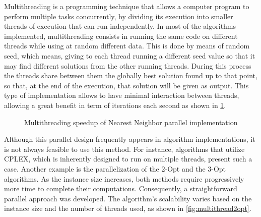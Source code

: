 Multithreading is a programming technique that allows a computer program to perform multiple tasks concurrently, by dividing its execution into smaller threads of execution that can run independently.
In most of the algorithms implemented, multithreading consists in running the same code on different threads while using at random different data.
This is done by means of random seed, which means, giving to each thread running a different seed value so that it may find different solutions from the other running threads.
During this process the threads share between them the globally best solution found up to that point, so that, at the end of the execution, that solution will be given as output.
This type of implementation allows to have minimal interaction between threads, allowing a great benefit in term of iterations each second as shown in \figurename{ \ref{fig:multithreadNN}}.

\begin{figure}[htbp]
    \centering
	\caption{Multithreading speedup of Nearest Neighbor parallel implementation} \label{fig:multithreadNN}
\end{figure}

Although this parallel design frequently appears in algorithm implementations, it is not always feasible to use this method.
For instance, algorithms that utilize CPLEX, which is inherently designed to run on multiple threads, present such a case.
Another example is the parallelization of the 2-Opt and the 3-Opt algorithms.
As the instance size increases, both methods require progressively more time to complete their computations.
Consequently, a straightforward parallel approach was developed.
The algorithm's scalability varies based on the instance size and the number of threads used, as shown in \figurename{ \ref{fig:multithread2opt}}.

